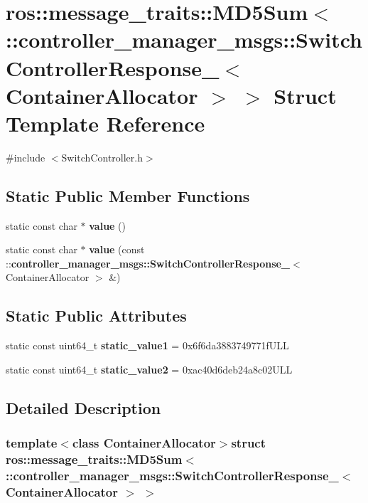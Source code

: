 \section{ros\-:\-:message\-\_\-traits\-:\-:\-M\-D5\-Sum$<$ \-:\-:controller\-\_\-manager\-\_\-msgs\-:\-:\-Switch\-Controller\-Response\-\_\-$<$ \-Container\-Allocator $>$ $>$ \-Struct \-Template \-Reference}
\label{structros_1_1message__traits_1_1MD5Sum_3_01_1_1controller__manager__msgs_1_1SwitchControllerRespce67787cdaf8615379cda5d0bfd4b60f}


{\ttfamily \#include $<$\-Switch\-Controller.\-h$>$}

\subsection*{\-Static \-Public \-Member \-Functions}
\begin{DoxyCompactItemize}
\item 
static const char $\ast$ {\bf value} ()
\item 
static const char $\ast$ {\bf value} (const \-::{\bf controller\-\_\-manager\-\_\-msgs\-::\-Switch\-Controller\-Response\-\_\-}$<$ \-Container\-Allocator $>$ \&)
\end{DoxyCompactItemize}
\subsection*{\-Static \-Public \-Attributes}
\begin{DoxyCompactItemize}
\item 
static const uint64\-\_\-t {\bf static\-\_\-value1} = 0x6f6da3883749771f\-U\-L\-L
\item 
static const uint64\-\_\-t {\bf static\-\_\-value2} = 0xac40d6deb24a8c02\-U\-L\-L
\end{DoxyCompactItemize}


\subsection{\-Detailed \-Description}
\subsubsection*{template$<$class Container\-Allocator$>$struct ros\-::message\-\_\-traits\-::\-M\-D5\-Sum$<$ \-::controller\-\_\-manager\-\_\-msgs\-::\-Switch\-Controller\-Response\-\_\-$<$ Container\-Allocator $>$ $>$}



